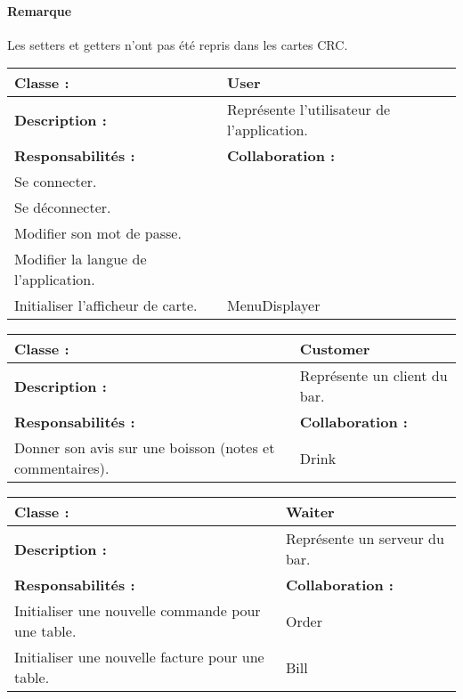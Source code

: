 

\paragraph{Remarque} Les setters et getters
n'ont pas été repris dans les cartes CRC.

\begin{center}

\begin{tabular}{|p{6cm}p{6cm}|}
	\hline
		\textbf{Classe :} & User \\
	\hline
		\textbf{Description :} & Représente l'utilisateur de l'application. \\
	\hline
		\textbf{Responsabilités :} & \textbf{Collaboration :} \\
		Se connecter. & \\
		Se déconnecter. & \\
		Modifier son mot de passe. & \\
		Modifier la langue de l'application. & \\
		Initialiser l'afficheur de carte. & MenuDisplayer \\
	\hline		
\end{tabular}

\vspace{0.5cm}

\begin{tabular}{|p{6cm}p{6cm}|}
	\hline
		\textbf{Classe :} & Customer \\
	\hline
		\textbf{Description :} & Représente un client du bar. \\
	\hline
		\textbf{Responsabilités :} & \textbf{Collaboration :} \\

		Donner son avis sur une boisson (notes et commentaires). & Drink \\

	\hline		
\end{tabular}

\vspace{0.5cm}

\begin{tabular}{|p{6cm}p{6cm}|}
	\hline
		\textbf{Classe :} & Waiter \\
	\hline
		\textbf{Description :} & Représente un serveur du bar. \\
	\hline
		\textbf{Responsabilités :} & \textbf{Collaboration :} \\
		Initialiser une nouvelle commande pour une table. & Order \\
		Initialiser une nouvelle facture pour une table. & Bill \\
	\hline		
\end{tabular}


\end{center}

